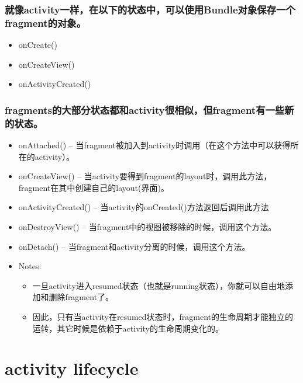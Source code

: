 \documentclass[9pt, b5paaper]{book}
\begin{document}
\subsection{就像activity一样，在以下的状态中，可以使用Bundle对象保存一个fragment的对象。}
\label{sec-3-1-5}
\begin{itemize}
\item onCreate()
\item onCreateView()
\item onActivityCreated()
\end{itemize}
\subsection{fragments的大部分状态都和activity很相似，但fragment有一些新的状态。}
\label{sec-3-1-6}
\begin{itemize}
\item onAttached() -- 当fragment被加入到activity时调用（在这个方法中可以获得所在的activity）。
\item onCreateView() -- 当activity要得到fragment的layout时，调用此方法，fragment在其中创建自己的layout(界面)。
\item onActivityCreated() -- 当activity的onCreated()方法返回后调用此方法
\item onDestroyView() -- 当fragment中的视图被移除的时候，调用这个方法。
\item onDetach() -- 当fragment和activity分离的时候，调用这个方法。
\item Notes:
\begin{itemize}
\item 一旦activity进入resumed状态（也就是running状态），你就可以自由地添加和删除fragment了。
\item 因此，只有当activity在resumed状态时，fragment的生命周期才能独立的运转，其它时候是依赖于activity的生命周期变化的。
\end{itemize}
\end{itemize}


\chapter{activity lifecycle}
\label{sec-4}
\end{document}

